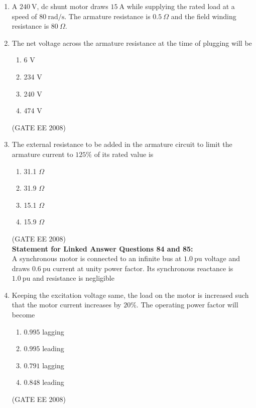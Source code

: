 \documentclass[journal,12pt,onecolumn]{IEEEtran}
\theoremstyle{remark}
\begin{document}
\begin{enumerate}[start=1, label=Q.\arabic*]
\item A $240\ \text{V}$, dc shunt motor draws $15\ \text{A}$ while supplying the rated load at a speed of $80\ \text{rad/s}$. The armature resistance is $0.5\ \Omega$ and the field winding resistance is $80\ \Omega$.
\\ [5mm]

\item The net voltage across the armature resistance at the time of plugging will be

\begin{multicols}{2}
\begin{enumerate}[label=(\Alph*)]
    \item 6 V
    \item 234 V
    \item 240 V
    \item 474 V
\end{enumerate}
\end{multicols}
\hfill (GATE EE 2008) \\[5mm]

\item The external resistance to be added in the armature circuit to limit the armature current to $125\%$ of its rated value is

\begin{multicols}{2}
\begin{enumerate}[label=(\Alph*)]
    \item 31.1 $\Omega$
    \item 31.9 $\Omega$
    \item 15.1 $\Omega$
    \item 15.9 $\Omega$
\end{enumerate}
\end{multicols}
\hfill (GATE EE 2008) \\[5mm]

\textbf{Statement for Linked Answer Questions 84 and 85:}\\

 A synchronous motor is connected to an infinite bus at $1.0\ \text{pu}$ voltage and draws $0.6\ \text{pu}$ current at unity power factor. Its synchronous reactance is $1.0\ \text{pu}$ and resistance is negligible\\

\item  Keeping the excitation voltage same, the load on the motor is increased such that the motor current increases by $20\%$. The operating power factor will become

\begin{multicols}{2}
\begin{enumerate}[label=(\Alph*)]
  \item $0.995$ lagging
  \item $0.995$ leading
  \item $0.791$ lagging
  \item $0.848$ leading
\end{enumerate}
\end{multicols}
\hfill (GATE EE 2008) \\[5mm]





\end{enumerate}
    
\end{document}
